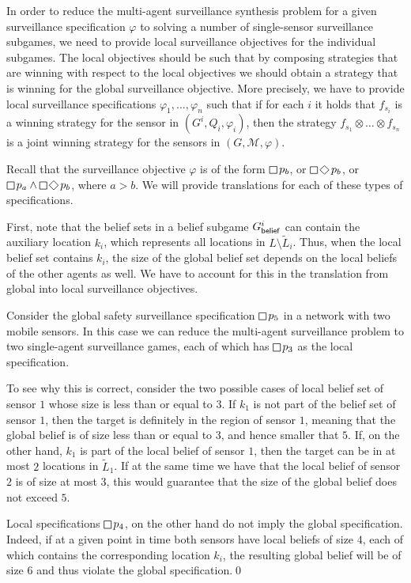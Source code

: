 In order to reduce the multi-agent surveillance synthesis problem for a given surveillance specification $\varphi$ to solving a number of single-sensor surveillance subgames, we need to provide local surveillance objectives for the individual subgames. The local objectives should be such that by composing strategies that are winning with respect to the local objectives we should obtain a strategy that is winning for the global surveillance objective. More precisely, we have to provide local surveillance specifications $\varphi_1,\ldots,\varphi_n$ such that if for each $i$ it holds that $f_{s_i}$ is  a winning strategy for the sensor in $(G^i,Q_i,\varphi_i)$, then the strategy $f_{s_1}\otimes \ldots \otimes f_{s_n}$ is  a joint winning strategy for the sensors in $(G,\mathcal M,\varphi)$.

Recall that the surveillance objective $\varphi$ is of the form $\LTLglobally p_b$, or $\LTLglobally\LTLfinally p_b$, or $\LTLglobally p_a \wedge \LTLglobally\LTLfinally p_b$, where $a > b$. We will provide translations for each of these types of  specifications.

First, note that the belief sets in a belief subgame $G^i_{\mathsf{belief}}$ can contain the auxiliary location $k_i$, which represents all locations in $L \setminus \widetilde L_i$. Thus, when the local belief set contains $k_i$, the size of the global belief set depends on the local beliefs of the other agents as well. We have to account for this in the translation from global into local surveillance objectives.

\begin{example}\label{ex:global-local-safety}
Consider the global safety surveillance specification $\LTLglobally p_5$ in a network with two mobile sensors. In this case we can reduce the multi-agent surveillance problem to two single-agent surveillance games, each of which has $\LTLglobally p_3$ as the local specification. 

To see why this is correct, consider the two possible cases of local belief set of sensor $1$ whose size is less than or equal to $3$. If $k_1$ is not part of the belief set of sensor $1$, then the target is definitely in the region of sensor $1$, meaning that the global belief is of size less than or equal to $3$, and hence smaller that $5$. If, on the other hand, $k_1$ is part of the local belief of sensor $1$, then the target can be in at most $2$ locations in $\widetilde L_1$. If at the same time we have that the local belief of sensor $2$ is of size at most $3$, this would guarantee that the size of the global belief does not exceed $5$. 

Local specifications $\LTLglobally p_4$, on the other hand do not imply the global specification. Indeed, if at a given point in time both sensors have local beliefs of size $4$, each of which contains the corresponding location $k_i$, the resulting global belief will be of size $6$ and thus violate the global specification.\qed
\end{example}

